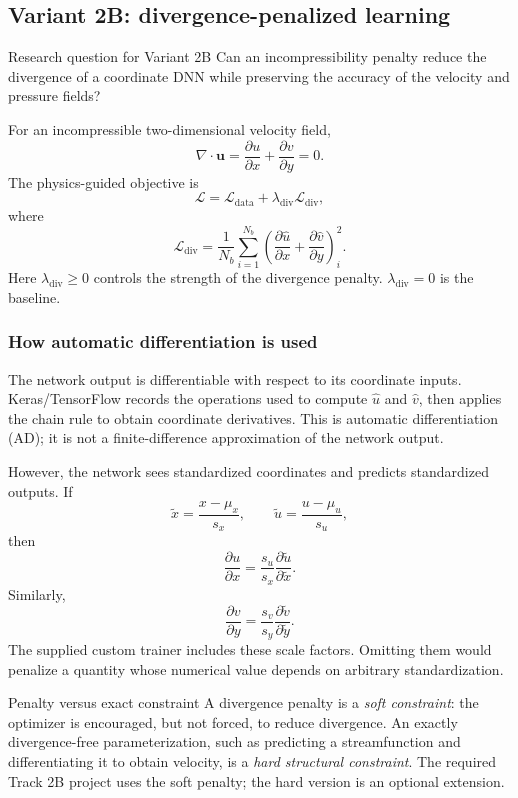 \documentclass[11pt]{article}
\begin{document}
\subsection{Variant 2B: divergence-penalized learning}
\begin{projectbox}{Research question for Variant 2B}
Can an incompressibility penalty reduce the divergence of a coordinate DNN while preserving the accuracy of the velocity and pressure fields?
\end{projectbox}

For an incompressible two-dimensional velocity field,
\[
\nabla\cdot\mathbf u
=\frac{\partial u}{\partial x}
+\frac{\partial v}{\partial y}=0.
\]
The physics-guided objective is
\[
\mathcal L
=\mathcal L_{\mathrm{data}}
+\lambda_{\mathrm{div}}\mathcal L_{\mathrm{div}},
\]
where
\[
\mathcal L_{\mathrm{div}}
=\frac{1}{N_b}\sum_{i=1}^{N_b}
\left(
\frac{\partial \hat u}{\partial x}
+\frac{\partial \hat v}{\partial y}
\right)_i^2.
\]
Here $\lambda_{\mathrm{div}}\ge0$ controls the strength of the divergence penalty. $\lambda_{\mathrm{div}}=0$ is the baseline.

\subsubsection{How automatic differentiation is used}
The network output is differentiable with respect to its coordinate inputs. Keras/TensorFlow records the operations used to compute $\hat u$ and $\hat v$, then applies the chain rule to obtain coordinate derivatives. This is automatic differentiation (AD); it is not a finite-difference approximation of the network output.

However, the network sees standardized coordinates and predicts standardized outputs. If
\[
\widetilde x=\frac{x-\mu_x}{s_x},
\qquad
\widetilde u=\frac{u-\mu_u}{s_u},
\]
then
\[
\frac{\partial u}{\partial x}
=\frac{s_u}{s_x}
\frac{\partial \widetilde u}{\partial \widetilde x}.
\]
Similarly,
\[
\frac{\partial v}{\partial y}
=\frac{s_v}{s_y}
\frac{\partial \widetilde v}{\partial \widetilde y}.
\]
The supplied custom trainer includes these scale factors. Omitting them would penalize a quantity whose numerical value depends on arbitrary standardization.

\begin{definitionbox}{Penalty versus exact constraint}
A divergence penalty is a \emph{soft constraint}: the optimizer is encouraged, but not forced, to reduce divergence. An exactly divergence-free parameterization, such as predicting a streamfunction and differentiating it to obtain velocity, is a \emph{hard structural constraint}. The required Track 2B project uses the soft penalty; the hard version is an optional extension.
\end{definitionbox}
\end{document}
